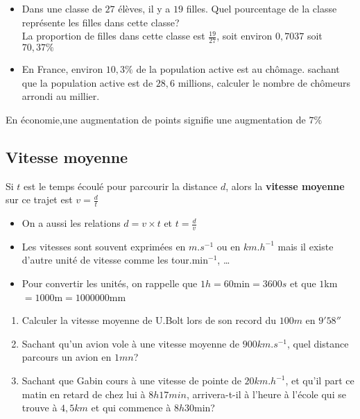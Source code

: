 \documentclass[10pt]{article}
\begin{document}
{\begin{Ex}   
\begin{itemize}
\item Dans une classe de $27$ élèves, il y a $19$ filles. Quel pourcentage de la classe représente les filles dans cette classe?
\\La proportion de filles dans cette classe est $\frac{19}{27}$, soit environ $0,7037$ soit $70,37 \%$
\item En France, environ $10,3 \%$ de la population active est au chômage.
sachant que la population active est de $28,6$ millions, calculer le nombre de chômeurs arrondi au millier.
\end{itemize}
\end{Ex}

\begin{Rq}
En économie,une augmentation de  points \fg{} signifie une augmentation de $7 \%$ 
\end{Rq}

\subsection{Vitesse moyenne}

\begin{Df} 
Si $t$ est le temps écoulé pour parcourir la distance $d$, alors la \textbf{vitesse moyenne} sur ce trajet est $v=\frac{d}{t}$
\end{Df}

\begin{Rq}   
\begin{itemize}
\item On a aussi les relations $d=v \times t$ et $t=\frac{d}{v}$
\item Les vitesses sont souvent exprimées en $m.s^{-1}$ ou en $km.h^{-1}$ mais il existe d'autre unité de vitesse comme les tour.min$^{-1}$, \ldots{}
\item Pour convertir les unités, on rappelle que $1h=60$min$=3600s$ et que $1$km$=1000$m$=1000000$mm
\end{itemize}
\end{Rq}

\begin{Ex}
\begin{enumerate}
\item Calculer la vitesse moyenne de U.Bolt lors de son record du $100 m$ en $9'58''$
\item Sachant qu'un avion vole à une vitesse moyenne de $900 km.s^{-1}$, quel distance parcours un avion en $1 mn$?
\item Sachant que Gabin cours à une vitesse de pointe de $20 km.h^{-1}$, et qu'il part ce matin en retard de chez lui à $8h17min$, arrivera-t-il à l'heure à l'école qui se trouve à $4,5 km$ et qui commence à $8h30$min?
\end{enumerate}
\end{Ex}



}
\end{document}
